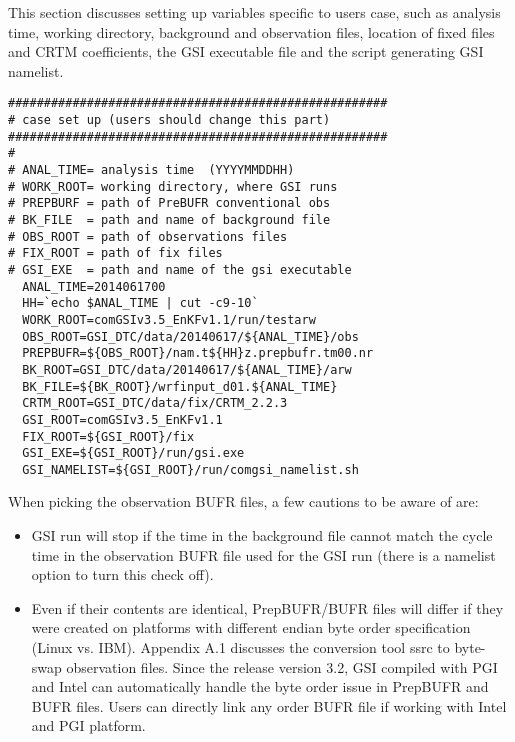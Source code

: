 
This section discusses setting up variables specific to user\textquotesingle s case, such as analysis time, working directory, background and observation files, location of fixed files and CRTM coefficients, the GSI executable file and the script generating GSI namelist. 

\begin{footnotesize}
\begin{verbatim}
#####################################################
# case set up (users should change this part)
#####################################################
#
# ANAL_TIME= analysis time  (YYYYMMDDHH)
# WORK_ROOT= working directory, where GSI runs
# PREPBURF = path of PreBUFR conventional obs
# BK_FILE  = path and name of background file
# OBS_ROOT = path of observations files
# FIX_ROOT = path of fix files
# GSI_EXE  = path and name of the gsi executable
  ANAL_TIME=2014061700
  HH=`echo $ANAL_TIME | cut -c9-10`
  WORK_ROOT=comGSIv3.5_EnKFv1.1/run/testarw
  OBS_ROOT=GSI_DTC/data/20140617/${ANAL_TIME}/obs
  PREPBUFR=${OBS_ROOT}/nam.t${HH}z.prepbufr.tm00.nr
  BK_ROOT=GSI_DTC/data/20140617/${ANAL_TIME}/arw
  BK_FILE=${BK_ROOT}/wrfinput_d01.${ANAL_TIME}
  CRTM_ROOT=GSI_DTC/data/fix/CRTM_2.2.3
  GSI_ROOT=comGSIv3.5_EnKFv1.1
  FIX_ROOT=${GSI_ROOT}/fix
  GSI_EXE=${GSI_ROOT}/run/gsi.exe
  GSI_NAMELIST=${GSI_ROOT}/run/comgsi_namelist.sh
\end{verbatim}
\end{footnotesize}

When picking the observation BUFR files, a few cautions to be aware of are: 

\begin{itemize}
\item GSI run will stop if the time in the background file cannot match the cycle time in the observation BUFR file used for the GSI run (there is a namelist option to turn this check off).
\item Even if their contents are identical, PrepBUFR/BUFR files will differ if they were created on platforms with different endian byte order specification (Linux vs. IBM). Appendix A.1 discusses the conversion tool ssrc to byte-swap observation files. Since the release version 3.2, GSI compiled with PGI and Intel can automatically handle the byte order issue in PrepBUFR and BUFR files. Users can directly link any order BUFR file if working with Intel and PGI platform.
\end{itemize}

